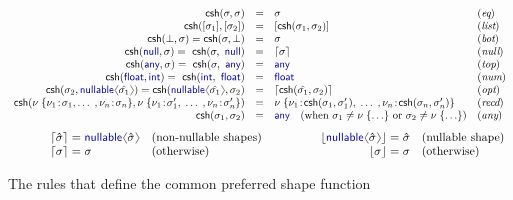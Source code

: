 \documentclass[10pt]{sigplanconf}
\newcommand{\langl}{\begin{picture}(4.5,7)
\put(1.1,2.5){\rotatebox{60}{\line(1,0){5.5}}}
\put(1.1,2.5){\rotatebox{300}{\line(1,0){5.5}}}
\end{picture}}
\newcommand{\rangl}{\begin{picture}(4.5,7)
\put(.9,2.5){\rotatebox{120}{\line(1,0){5.5}}}
\put(.9,2.5){\rotatebox{240}{\line(1,0){5.5}}}
\end{picture}}
\newcommand{\kvd}[1]{\textnormal{\textcolor{kvdclr}{\sffamily #1}}}
\newcommand{\ident}[1]{\textnormal{\sffamily #1}}
\newcommand{\narrow}[1]{\hspace{-0.7em} #1 \hspace{-0.7em}}
\newcommand{\dropopt}[1]{\lfloor#1\rfloor}
\newcommand{\addopt}[1]{\lceil#1\rceil}
\begin{document}

\begin{figure}[t]
\noindent
\begin{equation*}
\begin{array}{rcll}
\ident{csh}(\sigma, \sigma) &=& \sigma & (\emph{eq})\\
\ident{csh}([\sigma_1], [\sigma_2]) &=& [\ident{csh}(\sigma_1, \sigma_2)] & (\emph{list}) \\
\ident{csh}(\bot, \sigma) = \ident{csh}(\sigma, \bot) &=& \sigma & (\emph{bot})\\
\ident{csh}(\kvd{null}, \sigma) = \ident{csh}(\sigma, \kvd{null}) &=& \addopt{\sigma}& (\emph{null}) \\
\ident{csh}(\kvd{any}, \sigma) = \ident{csh}(\sigma, \kvd{any}) &=& \kvd{any} & (\emph{top})\\
\ident{csh}(\kvd{float}, \kvd{int}) = \ident{csh}(\kvd{int}, \kvd{float}) &=& \kvd{float} & (\emph{num})\\
\ident{csh}(\sigma_2, \kvd{nullable}\langl \hat{\sigma_1} \rangl) = \ident{csh}(\kvd{nullable}\langl \hat{\sigma_1} \rangl, \sigma_2) &=& \addopt{\ident{csh}(\hat{\sigma_1}, \sigma_2)} & (\emph{opt})\\
\ident{csh}(\nu \; \{ \nu_1 \!:\! \sigma_1,  \ldots \;, \nu_n \!:\! \sigma_n \}, 
  \nu \; \{ \nu_1 \!:\! \sigma'_1, \; \ldots \;, \nu_n \!:\! \sigma'_n \}) &=& 
  \nu \; \{ \nu_1 \!:\! \ident{csh}(\sigma_1, \sigma'_1), \; \ldots \; , \nu_n \!:\! \ident{csh}(\sigma_n, \sigma'_n) \} & (\emph{recd}) \\
\ident{csh}(\sigma_1, \sigma_2) &=& \kvd{any} \quad(\textnormal{when}~\sigma_1\neq\nu\;\{ \ldots \}~\textnormal{or}~\sigma_2\neq\nu\;\{ \ldots \} ) & (\emph{any})\\
\end{array}
\end{equation*}
%
\begin{equation*}
\quad\qquad
\begin{array}{rcll}
 \addopt{\hat{\sigma}} &\narrow{=}& \kvd{nullable}\langl\hat{\sigma}\rangl &(\textnormal{non-nullable shapes})\\
 \addopt{\sigma} &\narrow{=}& \sigma &(\textnormal{otherwise})
\end{array}
\qquad\qquad
\begin{array}{rcll}
 \dropopt{\kvd{nullable}\langl\hat{\sigma}\rangl} &\narrow{=}& \hat{\sigma} &(\textnormal{nullable shape})\\
 \dropopt{\sigma} &\narrow{=}& \sigma &(\textnormal{otherwise})
\end{array}
\end{equation*}

\caption{The rules that define the common preferred shape function}
\label{fig:subtyping-cst}
\end{figure}
\end{document}
